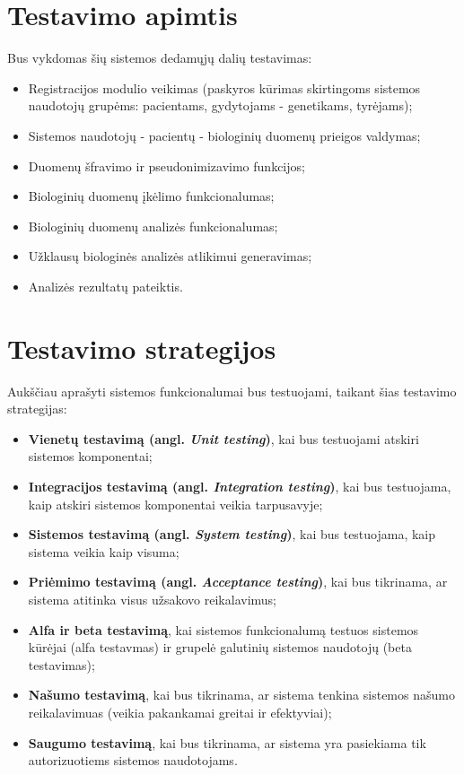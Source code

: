 \documentclass[12pt]{article}
\begin{document}
\section{Testavimo apimtis}
Bus vykdomas šių sistemos dedamųjų dalių testavimas:
\begin{itemize}
    \item Registracijos modulio veikimas (paskyros kūrimas skirtingoms sistemos
    naudotojų grupėms: pacientams, gydytojams - genetikams, tyrėjams);
    \item Sistemos naudotojų - pacientų - biologinių duomenų prieigos valdymas;
    \item Duomenų šfravimo ir pseudonimizavimo funkcijos;
    \item Biologinių duomenų įkėlimo funkcionalumas;
    \item Biologinių duomenų analizės funkcionalumas;
    \item Užklausų biologinės analizės atlikimui generavimas;
    \item Analizės rezultatų pateiktis.
\end{itemize}

\newpage

\section{Testavimo strategijos}
Aukščiau aprašyti sistemos funkcionalumai bus testuojami, taikant šias testavimo
strategijas:
\begin{itemize}
    \item \textbf{Vienetų testavimą (angl. \emph{Unit testing})}, kai bus
    testuojami atskiri sistemos komponentai;
    \item \textbf{Integracijos testavimą (angl. \emph{Integration testing})},
    kai bus testuojama, kaip atskiri sistemos komponentai veikia tarpusavyje;
    \item \textbf{Sistemos testavimą (angl. \emph{System testing})}, kai bus
    testuojama, kaip sistema veikia kaip visuma;
    \item \textbf{Priėmimo testavimą (angl. \emph{Acceptance testing})}, kai bus
    tikrinama, ar sistema atitinka visus užsakovo reikalavimus;
    \item \textbf{Alfa ir beta testavimą}, kai sistemos funkcionalumą testuos
    sistemos kūrėjai (alfa testavmas) ir grupelė galutinių sistemos naudotojų
    (beta testavimas);
    \item \textbf{Našumo testavimą}, kai bus tikrinama, ar sistema tenkina
    sistemos našumo reikalavimuas (veikia pakankamai greitai ir efektyviai);
    \item \textbf{Saugumo testavimą}, kai bus tikrinama, ar sistema yra
    pasiekiama tik autorizuotiems sistemos naudotojams.
\end{itemize}
\end{document}
